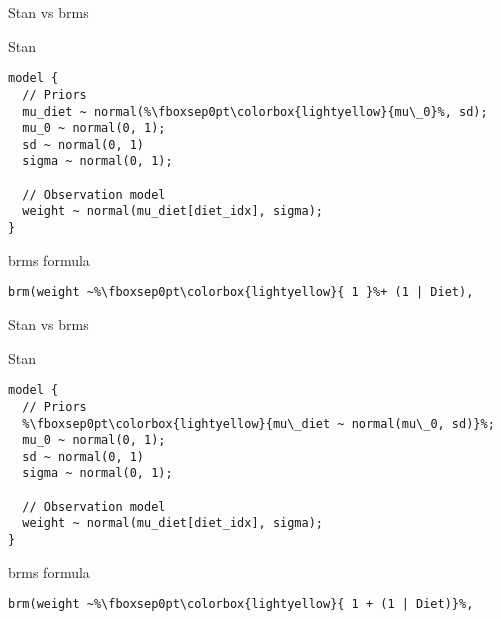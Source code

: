 \documentclass[finnish,english,t]{beamer}
\begin{document}
\begin{frame}[fragile]{Stan vs brms}

  \vspace{-0.5\baselineskip}

  Stan
  
\vspace{-0.5\baselineskip}
{\small
\begin{verbatim}
model {
  // Priors
  mu_diet ~ normal(%\fboxsep0pt\colorbox{lightyellow}{mu\_0}%, sd);
  mu_0 ~ normal(0, 1);
  sd ~ normal(0, 1)
  sigma ~ normal(0, 1);
  
  // Observation model
  weight ~ normal(mu_diet[diet_idx], sigma);
}
\end{verbatim}

  brms formula
  \vspace{-0.5\baselineskip}
\begin{verbatim}  
brm(weight ~%\fboxsep0pt\colorbox{lightyellow}{ 1 }%+ (1 | Diet),
\end{verbatim}
}

\end{frame}

\begin{frame}[fragile]{Stan vs brms}

  \vspace{-0.5\baselineskip}

  Stan
  
\vspace{-0.5\baselineskip}
{\small
\begin{verbatim}
model {
  // Priors
  %\fboxsep0pt\colorbox{lightyellow}{mu\_diet ~ normal(mu\_0, sd)}%;
  mu_0 ~ normal(0, 1);
  sd ~ normal(0, 1)
  sigma ~ normal(0, 1);
  
  // Observation model
  weight ~ normal(mu_diet[diet_idx], sigma);
}
\end{verbatim}

  brms formula
  \vspace{-0.5\baselineskip}
\begin{verbatim}  
brm(weight ~%\fboxsep0pt\colorbox{lightyellow}{ 1 + (1 | Diet)}%,
\end{verbatim}
}

\end{frame}
\end{document}
